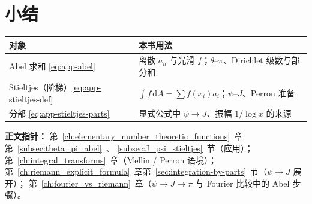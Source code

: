 \section{小结}
\label{sec:app-abel-stieltjes-summary}

\begin{center}
\renewcommand{\arraystretch}{1.45}
\begin{tabular}{@{}p{3.2cm}p{10cm}@{}}
\toprule
\textbf{对象} & \textbf{本书用法} \\
\midrule
Abel 求和 \eqref{eq:app-abel} &
  离散 $a_n$ 与光滑 $f$；$\theta$–$\pi$、Dirichlet 级数与部分和 \\
Stieltjes（阶梯）\eqref{eq:app-stieltjes-def} &
  $\int f\,\mathrm{d}A=\sum f(x_i)a_i$；$\psi$–$J$、Perron 准备 \\
分部 \eqref{eq:app-stieltjes-parts} &
  显式公式中 $\psi\to J$、振幅 $1/\log x$ 的来源 \\
\bottomrule
\end{tabular}
\end{center}

\vspace{0.5em}
\noindent
\textbf{正文指针：}
第~\ref{ch:elementary_number_theoretic_functions}~章第~\ref{subsec:theta_pi_abel}~、
\ref{subsec:J_psi_stieltjes}~节（应用）；
第~\ref{ch:integral_transforms}~章（Mellin / Perron 语境）；
第~\ref{ch:riemann_explicit_formula}~章第~\ref{sec:integration-by-parts}~节（$\psi\to J$ 展开）；
第~\ref{ch:fourier_vs_riemann}~章（$\psi\to J\to\pi$ 与 Fourier 比较中的 Abel 步骤）。

